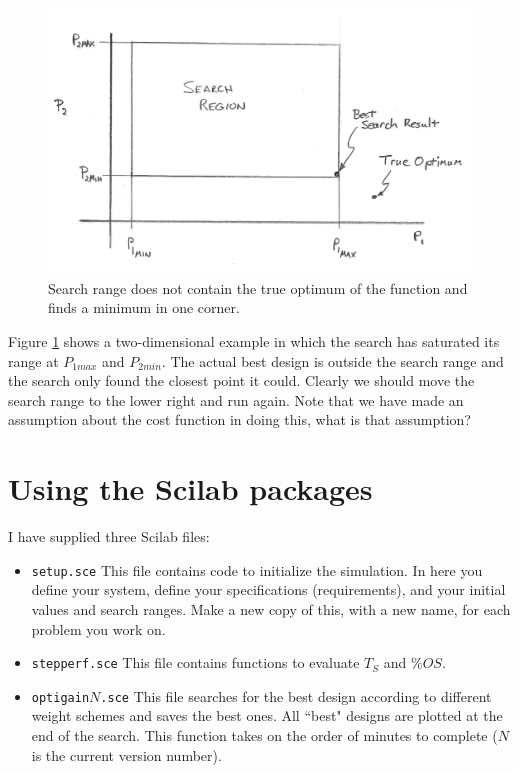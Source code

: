 \begin{figure}\centering
\includegraphics[width=4.5in]{figs10/00649a.png}
\caption{Search range does not contain the true optimum of the function and finds a minimum in one corner.}\label{rangesat}
\end{figure}


Figure \ref{rangesat} shows a two-dimensional example in which the search has saturated its range at $P_{1max}$ and $P_{2min}$.  The actual best design is outside the search range and the search only found the closest point it could.   Clearly we should move the search range to the lower right and run again.   Note that we have made an assumption about the cost function in doing this, what is that assumption?	%





\section{Using the Scilab packages}

I have supplied three Scilab files:
\begin{itemize}
  \item {\tt setup.sce}
This file contains code to initialize the simulation.  In here you define your system, define your specifications (requirements), and your initial values and search ranges.  Make a new copy of this, with a new name, for each problem you work on.	%
  \item {\tt stepperf.sce}
This file contains functions to evaluate $T_S$ and $\%OS$.	%
  \item {\tt optigain$N$.sce}
  This file searches for the best design according to different weight schemes and saves the best ones.  All ``best" designs are plotted at the end of the search.  This function takes on the order of minutes to complete ($N$ is the current version number).
\end{itemize}

